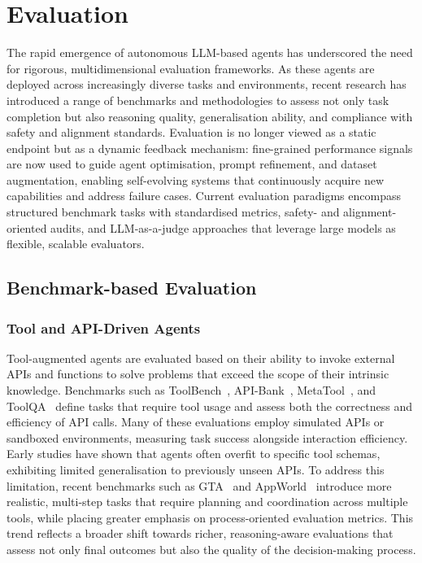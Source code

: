 \section{Evaluation}
\label{sec:evaluation}

The rapid emergence of autonomous LLM-based agents has underscored the need for rigorous, multidimensional evaluation frameworks. As these agents are deployed across increasingly diverse tasks and environments, recent research has introduced a range of benchmarks and methodologies to assess not only task completion but also reasoning quality, generalisation ability, and compliance with safety and alignment standards. Evaluation is no longer viewed as a static endpoint but as a dynamic feedback mechanism: fine-grained performance signals are now used to guide agent optimisation, prompt refinement, and dataset augmentation, enabling self-evolving systems that continuously acquire new capabilities and address failure cases. Current evaluation paradigms encompass structured benchmark tasks with standardised metrics, safety- and alignment-oriented audits, and LLM-as-a-judge approaches that leverage large models as flexible, scalable evaluators. 

\subsection{Benchmark-based Evaluation}

\subsubsection{Tool and API-Driven Agents}
Tool-augmented agents are evaluated based on their ability to invoke external APIs and functions to solve problems that exceed the scope of their intrinsic knowledge. Benchmarks such as ToolBench~\citep{xu2023tool}, API-Bank~\citep{li2023api}, MetaTool~\citep{huang2023metatool}, and ToolQA~\citep{zhuang2023toolqa} define tasks that require tool usage and assess both the correctness and efficiency of API calls. Many of these evaluations employ simulated APIs or sandboxed environments, measuring task success alongside interaction efficiency. Early studies have shown that agents often overfit to specific tool schemas, exhibiting limited generalisation to previously unseen APIs. To address this limitation, recent benchmarks such as GTA~\citep{wang2024gta} and AppWorld~\citep{trivedi2024appworld} introduce more realistic, multi-step tasks that require planning and coordination across multiple tools, while placing greater emphasis on process-oriented evaluation metrics. This trend reflects a broader shift towards richer, reasoning-aware evaluations that assess not only final outcomes but also the quality of the decision-making process.

